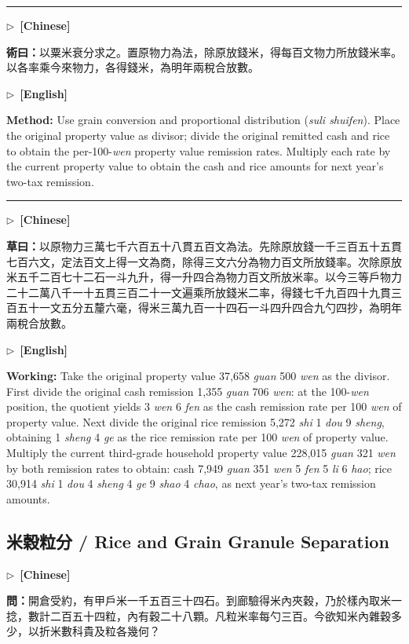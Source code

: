 \documentclass[10pt,a4paper]{article}
\newcommand{\longline}{\par\noindent\rule{\textwidth}{0.4pt}\par}
\newcommand{\CNmarker}{\noindent\textcolor{cnlabel}{$\triangleright$\ \textbf{[Chinese]}}\par}
\newcommand{\ENmarker}{\noindent\textcolor{enlabel}{$\triangleright$\ \textbf{[English]}}\par}
\newcommand{\Question}[1]{\par\noindent\textbf{\color{problemcolor}問：}#1\par}
\newcommand{\Method}[1]{\par\noindent\textbf{\color{methodcolor}術曰：}#1\par}
\newcommand{\Working}[1]{\par\noindent\textbf{\color{workingcolor}草曰：}#1\par}
\newcommand{\MethodEn}[1]{\par\noindent\textbf{\color{methodcolor}Method:} #1\par}
\newcommand{\WorkingEn}[1]{\par\noindent\textbf{\color{workingcolor}Working:} #1\par}
\begin{document}
\longline

\CNmarker
\Method{以粟米衰分求之。置原物力為法，除原放錢米，得每百文物力所放錢米率。以各率乘今來物力，各得錢米，為明年兩稅合放數。}

\ENmarker
\MethodEn{Use grain conversion and proportional distribution (\textit{suli shuifen}). Place the original property value as divisor; divide the original remitted cash and rice to obtain the per-100-\textit{wen} property value remission rates. Multiply each rate by the current property value to obtain the cash and rice amounts for next year's two-tax remission.}

\longline

\CNmarker
\Working{以原物力三萬七千六百五十八貫五百文為法。先除原放錢一千三百五十五貫七百六文，定法百文上得一文為商，除得三文六分為物力百文所放錢率。次除原放米五千二百七十二石一斗九升，得一升四合為物力百文所放米率。以今三等戶物力二十二萬八千一十五貫三百二十一文遍乘所放錢米二率，得錢七千九百四十九貫三百五十一文五分五釐六毫，得米三萬九百一十四石一斗四升四合九勺四抄，為明年兩稅合放數。}

\ENmarker
\WorkingEn{Take the original property value 37,658 \textit{guan} 500 \textit{wen} as the divisor. First divide the original cash remission 1,355 \textit{guan} 706 \textit{wen}: at the 100-\textit{wen} position, the quotient yields 3 \textit{wen} 6 \textit{fen} as the cash remission rate per 100 \textit{wen} of property value. Next divide the original rice remission 5,272 \textit{shi} 1 \textit{dou} 9 \textit{sheng}, obtaining 1 \textit{sheng} 4 \textit{ge} as the rice remission rate per 100 \textit{wen} of property value. Multiply the current third-grade household property value 228,015 \textit{guan} 321 \textit{wen} by both remission rates to obtain: cash 7,949 \textit{guan} 351 \textit{wen} 5 \textit{fen} 5 \textit{li} 6 \textit{hao}; rice 30,914 \textit{shi} 1 \textit{dou} 4 \textit{sheng} 4 \textit{ge} 9 \textit{shao} 4 \textit{chao}, as next year's two-tax remission amounts.}


\newpage
\subsection*{米穀粒分 / Rice and Grain Granule Separation}

\CNmarker
\Question{開倉受約，有甲戶米一千五百三十四石。到廊驗得米內夾穀，乃於樣內取米一捻，數計二百五十四粒，內有穀二十八顆。凡粒米率每勺三百。今欲知米內雜穀多少，以折米數科貴及粒各幾何？}
\end{document}

